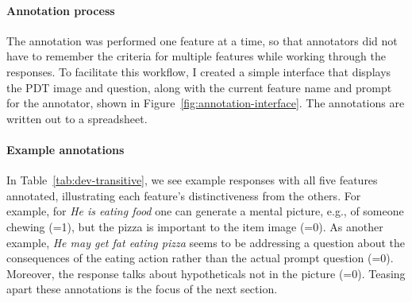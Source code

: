 \paragraph{Annotation process}
The annotation was performed one feature at a time, so that annotators did not have to remember the criteria for multiple features while working through the responses. To facilitate this workflow, I created a simple interface that displays the PDT image and question, along with the current feature name and prompt for the annotator, shown in Figure~\ref{fig:annotation-interface}. The annotations are written out to a spreadsheet.


\paragraph{Example annotations}

In Table~\ref{tab:dev-transitive}, we see example responses with all five features annotated, illustrating each feature's distinctiveness from the others.  For example, for \textit{He is eating food} one can generate a mental picture, e.g., of someone chewing (=1), but the pizza is important to the item image (=0).  As another example, \textit{He may get fat eating pizza} seems to be addressing a question about the consequences of the eating action rather than the actual prompt question (=0). Moreover, the response talks about hypotheticals not in the picture (=0).
Teasing apart these annotations is the focus of the next section.

